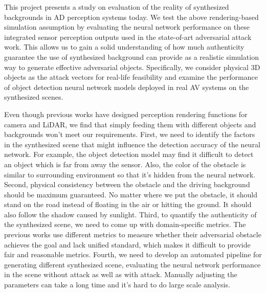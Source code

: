 This project presents a study on evaluation of the reality of synthesized backgrounds in AD perception systems today.
We test the above rendering-based simulation assumption by evaluating the neural network performance on these integrated sensor perception outputs used in the state-of-art adversarial attack work.
This allows us to gain a solid understanding of how much authenticity guarantee the use of synthesized background can provide as a realistic simulation way to generate effective adversarial objects.
Specifically, we consider physical 3D objects as the attack vectors for real-life feasibility and examine the performance of object detection neural network models deployed in real AV systems on the synthesized scenes.

Even though previous works have designed perception rendering functions for camera and LiDAR, we find that simply feeding them with different objects and backgrounds won't meet our requirements.
First, we need to identify the factors in the synthesized scene that might influence the detection accuracy of the neural network.
For example, the object detection model may find it difficult to detect an object which is far from away the sensor.
Also, the color of the obstacle is similar to surrounding environment so that it's hidden from the neural network.
Second, physical consistency between the obstacle and the driving background should be maximum guaranteed. 
No matter where we put the obstacle, it should stand on the road instead of floating in the air or hitting the ground.
It should also follow the shadow caused by sunlight.
Third, to quantify the authenticity of the synthesized scene, we need to come up with domain-specific metrics.
The previous works use different metrics to measure whether their adversarial obstacle achieves the goal and lack unified standard,
which makes it difficult to provide fair and reasonable metrics.
Fourth, we need to develop an automated pipeline for generating different synthesized scene, evaluating the neural network performance in the scene without attack as well as with attack.
Manually adjusting the parameters can take a long time and it's hard to do large scale analysis.

